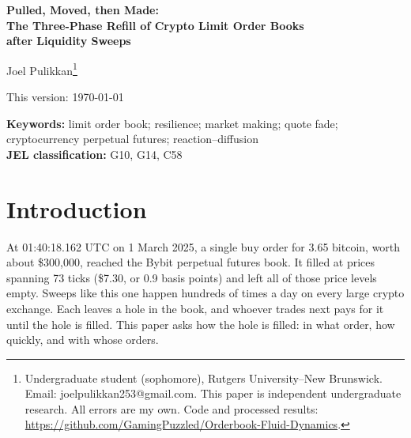 \documentclass[12pt]{article}
\begin{document}
\begin{titlepage}
\begin{center}
  {\LARGE\bfseries Pulled, Moved, then Made:\\[4pt]
  The Three-Phase Refill of Crypto Limit Order Books\\[4pt] after Liquidity Sweeps\par}
  \vspace{1.5em}
  {\large Joel Pulikkan\footnote{Undergraduate student (sophomore), Rutgers
  University--New Brunswick. Email: joelpulikkan253@gmail.com. This paper is independent
  undergraduate research. All errors are my own. Code and processed results:
  \url{https://github.com/GamingPuzzled/Orderbook-Fluid-Dynamics}.}\par}
  \vspace{1em}
  This version: \today
\end{center}
\vspace{2em}
\begin{abstract}
\noindent When a large market order sweeps several price levels, how does the limit order book refill? Using free 20-millisecond data on more than 42{,}000 sweeps in Bybit Bitcoin and Ether perpetual futures, I find three steps. Liquidity providers first withdraw orders across the book. Within about 100 milliseconds, depth cancelled deep in the book reappears at the new best price, rebuilding the touch while total depth is still falling. New liquidity arrives only after about half a second. The middle step appears only on small-tick books, where it removes most of the extra cost of trading again within 250 milliseconds.
\end{abstract}
\vspace{1em}
\noindent\textbf{Keywords:} limit order book; resilience; market making; quote fade;
cryptocurrency perpetual futures; reaction--diffusion\\[4pt]
\noindent\textbf{JEL classification:} G10, G14, C58
\end{titlepage}

\setcounter{footnote}{0}

\section{Introduction}

At 01:40:18.162 UTC on 1 March 2025, a single buy order for 3.65 bitcoin, worth about
\$300{,}000, reached the Bybit perpetual futures book. It filled at prices spanning 73 ticks
(\$7.30, or 0.9 basis points) and left all of those price levels empty. Sweeps like this one
happen hundreds of times a day on every large crypto exchange. Each leaves a hole in the book,
and whoever trades next pays for it until the hole is filled. This paper asks how the hole is
filled: in what order, how quickly, and with whose orders.
\end{document}
